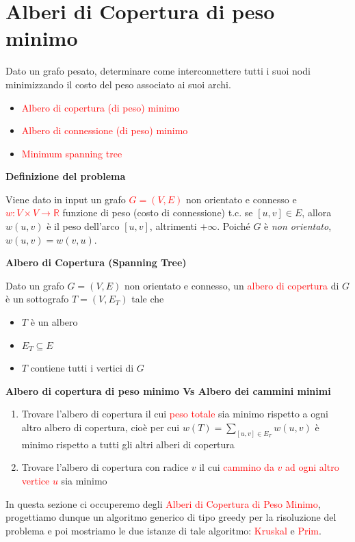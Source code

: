 \documentclass[../cheatSheetAlgoritmi.tex]{subfiles}
\begin{document}
\section{Alberi di Copertura di peso minimo}
Dato un grafo pesato, determinare come interconnettere tutti i suoi nodi minimizzando il costo del peso associato ai suoi archi.
\begin{itemize}
	\item \textcolor{red}{Albero di copertura (di peso) minimo}
	\item \textcolor{red}{Albero di connessione (di peso) minimo}
	\item \textcolor{red}{Minimum spanning tree}
\end{itemize}
\textbf{Definizione del problema}

Viene dato in input un grafo \textcolor{red}{$G = (V, E)$} non orientato e connesso e  \textcolor{red}{$w: V \times V \rightarrow \mathbb{R}$} funzione di peso (costo di connessione) t.c. se $[u, v] \in E$, allora $w(u, v)$ è il peso dell'arco $[u, v]$, altrimenti $+\infty$. Poiché $G$ è \emph{non orientato}, $w(u, v) = w(v, u)$.

\bigskip

\textbf{Albero di Copertura (Spanning Tree)}

Dato un grafo $G = (V, E)$ non orientato e connesso, un \textcolor{red}{albero di copertura} di $G$ è un sottografo $T = (V, E_{T})$ tale che 
\begin{itemize}
	\item $T$ è un albero
	\item $E_{T} \subseteq E$
	\item $T$ contiene tutti i vertici di $G$
\end{itemize}
\textbf{Albero di copertura di peso minimo Vs Albero dei cammini minimi}
\begin{enumerate}
	\item Trovare l'albero di copertura il cui \textcolor{red}{peso totale} sia minimo rispetto a ogni altro albero di copertura, cioè per cui $w(T) = \sum_{[u, v] \in E_{T}}w(u, v)$ è minimo rispetto a tutti gli altri alberi di copertura
	\item Trovare l'albero di copertura con radice $v$ il cui \textcolor{red}{cammino da $v$ ad ogni altro vertice $u$} sia minimo
\end{enumerate}
In questa sezione ci occuperemo degli \textcolor{red}{Alberi di Copertura di Peso Minimo}, progettiamo dunque un algoritmo generico di tipo greedy per la risoluzione del problema e poi mostriamo le due istanze di tale algoritmo: \textcolor{red}{Kruskal} e \textcolor{red}{Prim}.
\end{document}
